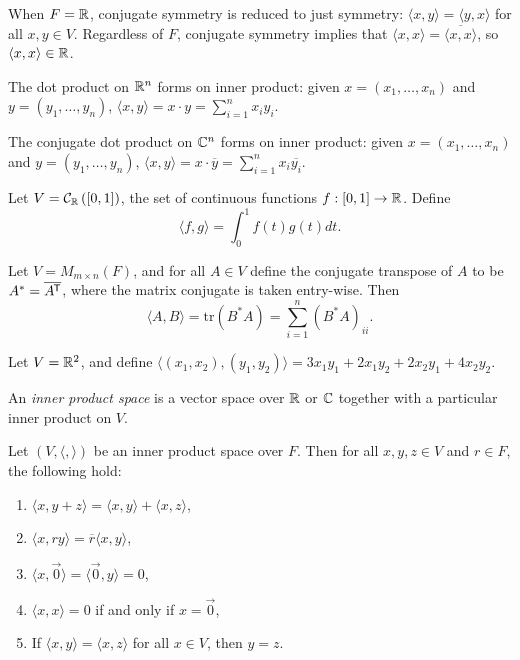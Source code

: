 \begin{rmk}
    When $F = \mathbb{R}$, conjugate symmetry is reduced to just symmetry: $\langle x, y\rangle = \langle y, x \rangle$ for all $x, y \in V$. Regardless of $F$, conjugate symmetry implies that $\langle x, x\rangle = \overline{\langle x, x\rangle}$, so $\langle x, x\rangle \in \mathbb{R}$.
\end{rmk}

\begin{exmp}
    The dot product on $\mathbb{R}^n$ forms on inner product: given $x = (x_1, \ldots, x_n)$ and $y = (y_1, \ldots, y_n)$, $\langle x, y\rangle = x \cdot y = \sum_{i=1}^{n}x_iy_i$.
\end{exmp}

\begin{exmp}
    The conjugate dot product on $\mathbb{C}^n$ forms on inner product: given $x = (x_1, \ldots, x_n)$ and $y = (y_1, \ldots, y_n)$, $\langle x, y\rangle = x \cdot \overline{y} = \sum_{i=1}^{n}x_i\overline{y_i}$.
\end{exmp}

\begin{exmp}
    Let $V = \mathcal{C}_{\mathbb{R}}\left([0, 1]\right)$, the set of continuous functions $f: [0, 1] \to \mathbb{R}$. Define
    \[\langle f, g \rangle = \int_0^1 f(t)g(t)dt.\]
\end{exmp}

\begin{exmp}
    Let $V = M_{m \times n}(F)$, and for all $A \in V$ define the conjugate transpose of $A$ to be $A^* = \overline{A^{\mkern-1.5mu\mathsf{T}}}$, where the matrix conjugate is taken entry-wise. Then
    \[\langle A, B \rangle = \textrm{tr}(B^*A) = \sum_{i=1}^{n}(B^*A)_{ii}.\]
\end{exmp}

\begin{exmp}
    Let $V = \mathbb{R}^2$, and define $\langle (x_1, x_2), (y_1, y_2) \rangle = 3x_1y_1 + 2x_1y_2 + 2x_2y_1 + 4x_2y_2$.
\end{exmp}

\begin{defn}
    An \emph{inner product space} is a vector space over $\mathbb{R}$ or $\mathbb{C}$ together with a particular inner product on $V$.
\end{defn}

\begin{thm}\label{inner-product-properties}
    Let $(V, \langle,\rangle)$ be an inner product space over $F$. Then for all $x, y, z \in V$ and $r \in F$, the following hold:
    \begin{enumerate}[label=(\arabic*)]
        \item $\langle x, y+z \rangle = \langle x, y \rangle + \langle x, z \rangle$,
        \item $\langle x, ry \rangle = \overline{r}\langle x, y \rangle$,
        \item $\langle x, \vec{0} \rangle = \langle \vec{0}, y \rangle = 0$,
        \item $\langle x, x \rangle = 0$ if and only if $x = \vec{0}$,
        \item If $\langle x, y \rangle = \langle x, z \rangle$ for all $x \in V$, then $y = z$.
    \end{enumerate}
\end{thm}

